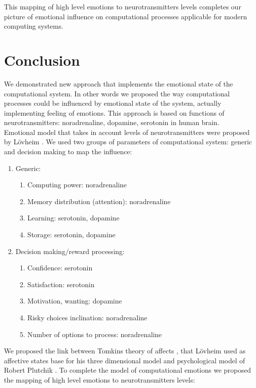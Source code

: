 This mapping of high level emotions to neurotransmitters levels completes our picture of emotional influence on computational processes applicable for modern computing systems.

\section{Conclusion}

We demonstrated new approach that implements the emotional state of the computational system. In other words we proposed the way computational processes could be influenced by emotional state of the system, actually implementing feeling of emotions. This approach is based on functions of neurotransmitters: noradrenaline, dopamine, serotonin in human brain. Emotional model that takes in account levels of neurotransmitters were proposed by L\"{o}vheim \cite{cubeofemotions}. We used two groups of parameters of computational system: generic and decision making to map the influence:

\begin{enumerate}
 \item  Generic:
 \begin{enumerate}
  \item  Computing power: noradrenaline
  \item  Memory distribution (attention): noradrenaline
  \item  Learning: serotonin, dopamine
  \item  Storage: serotonin, dopamine
 \end{enumerate}
 \item  Decision making/reward processing:
 \begin{enumerate}
  \item  Confidence: serotonin
  \item  Satisfaction: serotonin
  \item  Motivation, wanting: dopamine
  \item  Risky choices inclination: noradrenaline
  \item  Number of options to process: noradrenaline
 \end{enumerate}
\end{enumerate}

We proposed the link between Tomkins theory of affects \cite{tomkins1, tomkins2, tomkins3, quest}, that L\"{o}vheim used as affective states base for his three dimensional model and psychological model of Robert Plutchik  \cite{natureofemotions}. To complete the model of computational emotions we proposed the mapping of high level emotions to neurotransmitters levels:

